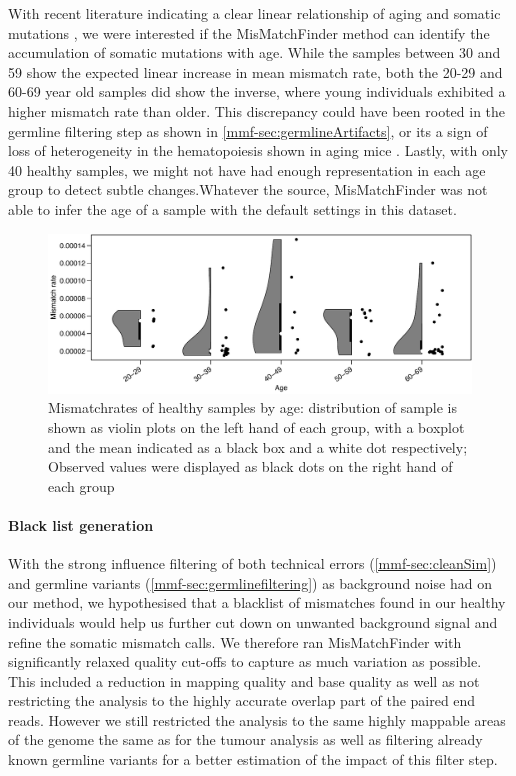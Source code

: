 With recent literature indicating a clear linear relationship of aging and somatic mutations \cite{Martincorena2018,Abascal2021,Cagan2022}, we were interested if the MisMatchFinder method can identify the accumulation of  somatic mutations with age. While the samples between 30 and 59 show the expected linear increase in mean mismatch rate, both the 20-29 and 60-69 year old samples did show the inverse, where young individuals exhibited a higher mismatch rate than older. This discrepancy could have been rooted in the germline filtering step as shown in \autoref{mmf-sec:germlineArtifacts}, or its a sign of loss of heterogeneity in the hematopoiesis shown in aging mice \cite{Ganuza2019}. Lastly, with only 40 healthy samples, we might not have had enough representation in each age group to detect subtle changes.Whatever the source, MisMatchFinder was not able to infer the age of a sample with the default settings in this dataset.

\begin{figure}[ht]
\centering
\includegraphics[width=.99\linewidth]{Figures/MisMatchFinder/MisMatchRateByAge.pdf}
\caption[Mismatchrates of healthy samples by age]{Mismatchrates of healthy samples by age: distribution of sample is shown as violin plots on the left hand of each group, with a boxplot and the mean indicated as a black box and a white dot respectively; Observed values were displayed as black dots on the right hand of each group}\label{fig:mmf-mmrByAge}
\end{figure}


\paragraph{Black list generation}
\label{mmf-sec:healthyBlacklist}
With the strong influence filtering of both technical errors (\autoref{mmf-sec:cleanSim}) and germline variants (\autoref{mmf-sec:germlinefiltering})  as background noise had on our method, we hypothesised that a blacklist of mismatches found in our healthy individuals would help us further cut down on unwanted background signal and refine the somatic mismatch calls. We therefore ran MisMatchFinder with significantly relaxed quality cut-offs to capture as much variation as possible. This included a reduction in mapping quality and base quality as well as not restricting the analysis to the highly accurate overlap part of the paired end reads. However we still restricted the analysis to the same highly mappable areas of the genome the same as for the tumour analysis as well as filtering already known germline variants for a better estimation of the impact of this filter step.

